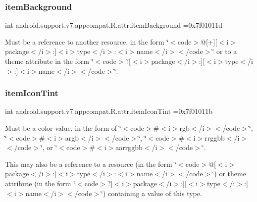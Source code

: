 \subsubsection{\texorpdfstring{item\+Background}{itemBackground}}
{\footnotesize\ttfamily int android.\+support.\+v7.\+appcompat.\+R.\+attr.\+item\+Background =0x7f01011d\hspace{0.3cm}{\ttfamily [static]}}

Must be a reference to another resource, in the form \char`\"{}$<$code$>$@\mbox{[}+\mbox{]}\mbox{[}$<$i$>$package$<$/i$>$\+:\mbox{]}$<$i$>$type$<$/i$>$\+:$<$i$>$name$<$/i$>$$<$/code$>$\char`\"{} or to a theme attribute in the form \char`\"{}$<$code$>$?\mbox{[}$<$i$>$package$<$/i$>$\+:\mbox{]}\mbox{[}$<$i$>$type$<$/i$>$\+:\mbox{]}$<$i$>$name$<$/i$>$$<$/code$>$\char`\"{}. \mbox{\label{classandroid_1_1support_1_1v7_1_1appcompat_1_1R_1_1attr_af738acc31f8dda0a49c48ffdd0cd864f}} 
\subsubsection{\texorpdfstring{item\+Icon\+Tint}{itemIconTint}}
{\footnotesize\ttfamily int android.\+support.\+v7.\+appcompat.\+R.\+attr.\+item\+Icon\+Tint =0x7f01011b\hspace{0.3cm}{\ttfamily [static]}}

Must be a color value, in the form of \char`\"{}$<$code$>$\#$<$i$>$rgb$<$/i$>$$<$/code$>$\char`\"{}, \char`\"{}$<$code$>$\#$<$i$>$argb$<$/i$>$$<$/code$>$\char`\"{}, \char`\"{}$<$code$>$\#$<$i$>$rrggbb$<$/i$>$$<$/code$>$\char`\"{}, or \char`\"{}$<$code$>$\#$<$i$>$aarrggbb$<$/i$>$$<$/code$>$\char`\"{}. 

This may also be a reference to a resource (in the form \char`\"{}$<$code$>$@\mbox{[}$<$i$>$package$<$/i$>$\+:\mbox{]}$<$i$>$type$<$/i$>$\+:$<$i$>$name$<$/i$>$$<$/code$>$\char`\"{}) or theme attribute (in the form \char`\"{}$<$code$>$?\mbox{[}$<$i$>$package$<$/i$>$\+:\mbox{]}\mbox{[}$<$i$>$type$<$/i$>$\+:\mbox{]}$<$i$>$name$<$/i$>$$<$/code$>$\char`\"{}) containing a value of this type. \mbox{\label{classandroid_1_1support_1_1v7_1_1appcompat_1_1R_1_1attr_a9d344008ecd9d058d86d949b6b8ce639}} 
